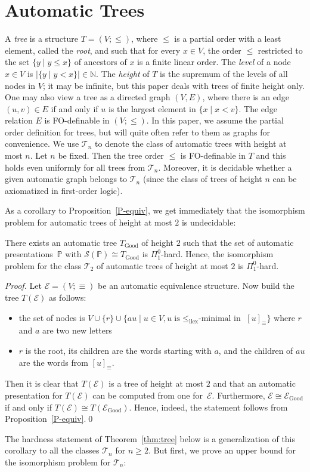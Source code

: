 \documentclass[envcountsame]{llncs}
\newcommand{\E}{\mathcal E}
\newcommand{\Good}{\mathrm{Good}}
\renewcommand{\P}{{\mathbb P}}
\renewcommand{\S}{\mathcal S}
\newcommand{\T}{\mathcal T}
\begin{document}
\section{Automatic Trees}\label{sec:tree}

A {\em tree} is a structure $T=(V;\leq)$, where $\leq$ is a
partial order with a least element, called the {\em root}, and such
that for every $x \in V$, the order $\leq$ restricted to the set
$\{y\mid y\leq x\}$ of ancestors of $x$ is a finite linear order.
The {\em level} of a node $x\in V$ is
$|\{y \mid y < x \}| \in \mathbb{N}$. The {\em height} of
$T$ is the supremum of the levels of all nodes in $V$; it may be
infinite, but this paper deals with trees of finite height only.
One may also view a tree as a directed graph $(V,E)$, where there is
an edge $(u,v)\in E$ if and only if $u$ is the largest element in $\{
x \mid x < v \}$.  The edge relation $E$ is FO-definable in
$(V;\leq)$. In this paper, we assume the partial order definition for
trees, but will quite often refer to them as graphs for
convenience.  We use $\T_n$ to denote the class of automatic trees with height at most
$n$. Let $n$ be fixed. Then the tree order $\leq$ is FO-definable in
$T$ and this holds even uniformly for all trees from $\T_n$. Moreover,
it is decidable whether a given automatic graph belongs to $\T_n$
(since the class of trees of height $n$ can be axiomatized in
first-order logic). 

As a corollary to Proposition~\ref{P-equiv}, we get immediately that the
isomorphism problem for automatic trees of height at most $2$ is
undecidable:

\begin{corollary}\label{crl:tree2}
  There exists an automatic tree $T_\Good$ of height $2$ such that the set of
  automatic presentations~$\P$ with $\S(\P)\cong T_\Good$ is
  $\Pi^0_1$-hard. Hence, the isomorphism problem for the class $\T_2$
  of automatic trees of height at most $2$ is $\Pi^0_1$-hard.
\end{corollary}

\begin{proof}
  Let $\E=(V;\equiv)$ be an automatic equivalence structure.
  Now build the tree $T(\E)$ as follows:
  \begin{itemize}
  \item the set of nodes is $V\cup \{r\} \cup \{au \mid u \in V, u\text{
      is $\leq_{\text{llex}}$-minimal in }[u]_\equiv\}$ where $r$ and
    $a$ are two new letters
  \item $r$ is the root, its children are the words starting with $a$,
    and the children of $au$ are the words from $[u]_\equiv$.
  \end{itemize}
  Then it is clear that $T(\E)$ is a tree of height at most $2$ and
  that an automatic presentation for $T(\E)$ can be computed from one
  for~$\E$. Furthermore, $\E\cong \E_\Good$ if and only if $T(\E)\cong
  T(\E_\Good)$. Hence, indeed, the statement follows from
  Proposition~\ref{P-equiv}.\qed
\end{proof}
The hardness statement of Theorem~\ref{thm:tree} below is a
generalization of this corollary to all the classes $\T_n$ for
$n\ge2$. But first, we prove an upper bound for the isomorphism
problem for $\T_n$:
\end{document}
